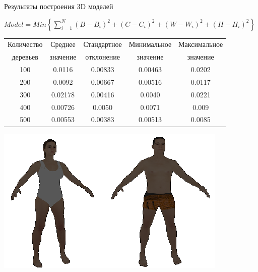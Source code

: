 \documentclass[10pt,pdf,hyperref={unicode},xcolor=table]{beamer}
\begin{document}
\begin{frame}{Результаты построения 3D моделей}
\begin{block}{}
$ Model = Min\left\{\sum^N_{i=1}\left(B-B_i\right)^2+\left(C-C_i\right)^2+\left(W-W_i\right)^2+\left(H-H_i\right)^2\right\}$
\end{block}	
\begin{table}[b!]%
\begin{center}
  \begin{tabular}{|c|c|c|c|c|}
    \hline
  Количество  & Среднее   &   Стандартное   & Минимальное   & Максимальное \\
деревьев     & значение  &    отклонение   & значение      &значение      \\
\hline
100	&0.0116	&0.00833	&0.00463	&0.0202\\
\hline
200	&0.0092	&0.00667	&0.00516	&0.0117 \\
\hline
300	&0.02178	&0.00416	&0.0040	&0.0221\\
\hline
400	&0.00726	&0.0050	&0.0071	&0.009\\
\hline
500	&0.00553	&0.00383	&0.00513	&0.0085\\
\hline
  \end{tabular}
\end{center}
\end{table}%

\begin{center}
\includegraphics[width=0.45\linewidth]{p14}
\end{center}

\end{frame}
\end{document}
